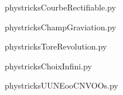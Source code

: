     

    \clearpage
    


    \newcommand{\CaptionFigCourbeRectifiable}{<+Type your caption here+>}
    \begin{center}
        
    \end{center}
    phystricksCourbeRectifiable.py

    

    \clearpage
    


    \newcommand{\CaptionFigChampGraviation}{<+Type your caption here+>}
    \begin{center}
        
    \end{center}
    phystricksChampGraviation.py

    

    \clearpage
    


    \newcommand{\CaptionFigToreRevolution}{<+Type your caption here+>}
    \begin{center}
        
    \end{center}
    phystricksToreRevolution.py

    

    \clearpage
    


    \newcommand{\CaptionFigChoixInfini}{<+Type your caption here+>}
    \begin{center}
        
    \end{center}
    phystricksChoixInfini.py

    

    \clearpage
    


    \newcommand{\CaptionFigUUNEooCNVOOs}{<+Type your caption here+>}
    \begin{center}
        
    \end{center}
    phystricksUUNEooCNVOOs.py

    

    \clearpage
    

